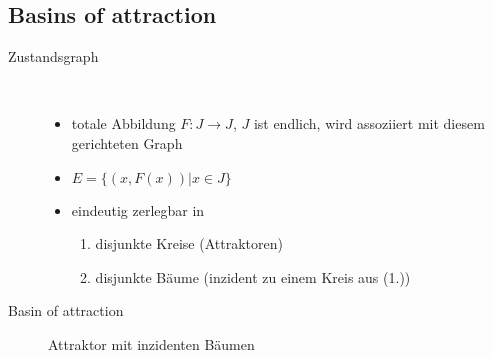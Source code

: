 \subsection{Basins of attraction}
	\begin{description}
		\item[Zustandsgraph] \ \\\vspace*{-\baselineskip}
			\begin{itemize}
				\item totale Abbildung $F:J\rightarrow J$, $J$ ist endlich, wird assoziiert mit diesem gerichteten Graph
				\item $E=\{(x,F(x))|x\in J\}$
				\item eindeutig zerlegbar in
					\begin{enumerate}
						\item disjunkte Kreise (Attraktoren)
						\item disjunkte Bäume (inzident zu einem Kreis aus (1.))
					\end{enumerate}
			\end{itemize}
		\item[Basin of attraction] Attraktor mit inzidenten Bäumen
	\end{description}